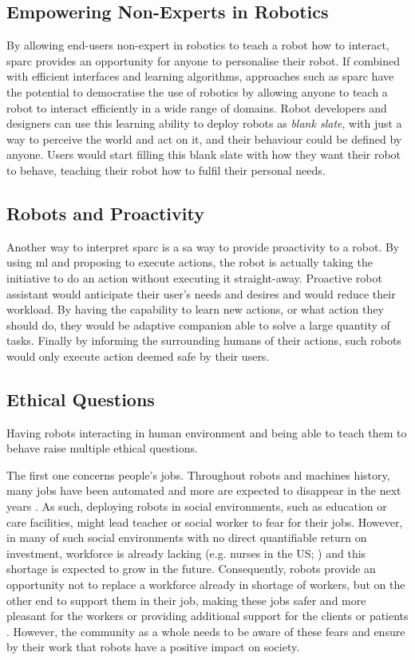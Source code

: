 \subsection{Empowering Non-Experts in Robotics}

By allowing end-users non-expert in robotics to teach a robot how to interact, \gls{sparc} provides an opportunity for anyone to personalise their robot. If combined with efficient interfaces and learning algorithms, approaches such as \gls{sparc} have the potential to democratise the use of robotics by allowing anyone to teach a robot to interact efficiently in a wide range of domains. Robot developers and designers can use this learning ability to deploy robots as \emph{blank slate}, with just a way to perceive the world and act on it, and their behaviour could be defined by anyone. Users would start filling this blank slate with how they want their robot to behave, teaching their robot how to fulfil their personal needs.

\subsection{Robots and Proactivity}

Another way to interpret \gls{sparc} is a sa way to provide proactivity to a robot. By using \gls{ml} and proposing to execute actions, the robot is actually taking the initiative to do an action without executing it straight-away. Proactive robot assistant would anticipate their user's needs and desires and would reduce their workload. By having the capability to learn new actions, or what action they should do, they would be adaptive companion able to solve a large quantity of tasks. Finally by informing the surrounding humans of their actions, such robots would only execute action deemed safe by their users.

\subsection{Ethical Questions} \label{sec:disc_ethics}

Having robots interacting in human environment and being able to teach them to behave raise multiple ethical questions.

The first one concerns people's jobs. Throughout robots and machines history, many jobs have been automated and more are expected to disappear in the next years \citep{frey2017future}. As such, deploying robots in social environments, such as education or care facilities, might lead teacher or social worker to fear for their jobs. However, in many of such social environments with no direct quantifiable return on investment, workforce is already lacking (e.g. nurses in the US; \citealt{nevidjon2001nursing}) and this shortage is expected to grow in the future. Consequently, robots provide an opportunity not to replace a workforce already in shortage of workers, but on the other end to support them in their job, making these jobs safer and more pleasant for the workers or providing additional support for the clients or patients \citep{belpaeme2012multimodal}. However, the community as a whole needs to be aware of these fears and ensure by their work that robots have a positive impact on society.

